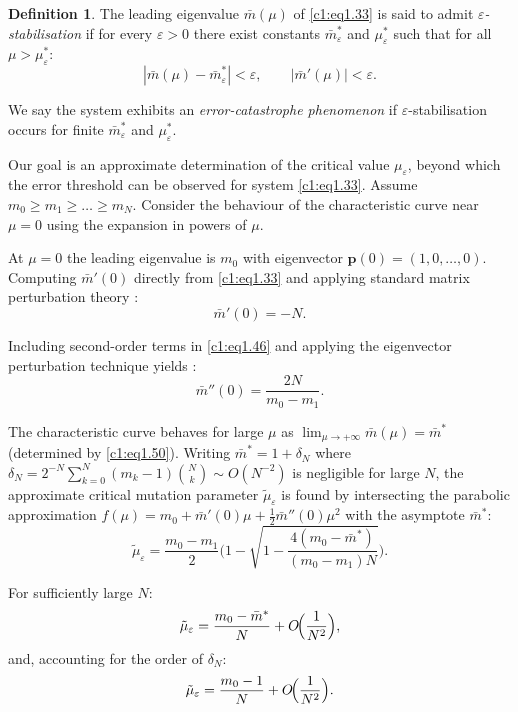 \documentclass[12pt]{report}
\newcommand{\bs}[1]{\bm{#1}}
\theoremstyle{definition}
\newtheorem{definition}[theorem]{Definition}
\theoremstyle{remark}
\begin{document}
\begin{definition}
The leading eigenvalue $\bar{m}(\mu)$ of \eqref{c1:eq1.33} is said to
admit \emph{$\varepsilon$-stabilisation} if for every $\varepsilon>0$
there exist constants $\bar{m}^*_\varepsilon$ and $\mu^*_\varepsilon$
such that for all $\mu>\mu^*_\varepsilon$:
\[
  |\bar{m}(\mu)-\bar{m}^*_\varepsilon|<\varepsilon,\qquad
  |\bar{m}'(\mu)|<\varepsilon.
\]
\end{definition}

We say the system exhibits an \emph{error-catastrophe phenomenon}
if $\varepsilon$-stabilisation occurs for finite $\bar{m}^*_\varepsilon$
and $\mu^*_\varepsilon$.

Our goal is an approximate determination of the critical value
$\mu_\varepsilon$, beyond which the error threshold can be observed for
system \eqref{c1:eq1.33}.  Assume $m_0\geqslant m_1\geqslant\ldots\geqslant m_N$.
Consider the behaviour of the characteristic curve near
$\mu=0$ using the expansion in powers of $\mu$.

At $\mu=0$ the leading eigenvalue is $m_0$ with eigenvector
$\bs{p}(0)=(1,0,\ldots,0)$.  Computing $\bar{m}'(0)$ directly from
\eqref{c1:eq1.33} and applying standard matrix perturbation theory
\cite{c1:Kato1976}:
\begin{equation}
  \bar{m}'(0)=-N.
  \label{c1:eq1.51}
\end{equation}

Including second-order terms in \eqref{c1:eq1.46} and applying the
eigenvector perturbation technique \cite{c1:Kato1976} yields
\cite{c1:bratus2014_2}:
\begin{equation}
  \bar{m}''(0)=\frac{2N}{m_0-m_1}.
  \label{c1:eq1.52}
\end{equation}

The characteristic curve behaves for large $\mu$ as
$\lim_{\mu\to+\infty}\bar{m}(\mu)=\bar{m}^*$ (determined by
\eqref{c1:eq1.50}).  Writing $\bar{m}^*=1+\delta_N$ where
$\delta_N=2^{-N}\sum_{k=0}^N(m_k-1)\binom{N}{k}\sim O(N^{-2})$
is negligible for large $N$, the approximate critical mutation
parameter $\tilde{\mu}_\varepsilon$ is found by intersecting the
parabolic approximation
$f(\mu)=m_0+\bar{m}'(0)\mu+\frac{1}{2}\bar{m}''(0)\mu^2$
with the asymptote $\bar{m}^*$:
\[
  \tilde{\mu}_\varepsilon
  =\frac{m_0-m_1}{2}
   \Biggl(1-\sqrt{1-\frac{4(m_0-\bar{m}^*)}{(m_0-m_1)N}}\Biggr).
\]

For sufficiently large $N$:
\[
  \tilde{\mu}_\varepsilon
  =\frac{m_0-\bar{m}^*}{N}+O\!\Bigl(\frac{1}{N^2}\Bigr),
\]
and, accounting for the order of $\delta_N$:
\begin{equation}
  \tilde{\mu}_\varepsilon=\frac{m_0-1}{N}+O\!\Bigl(\frac{1}{N^2}\Bigr).
  \label{c1:eq1.53}
\end{equation}
\end{document}
